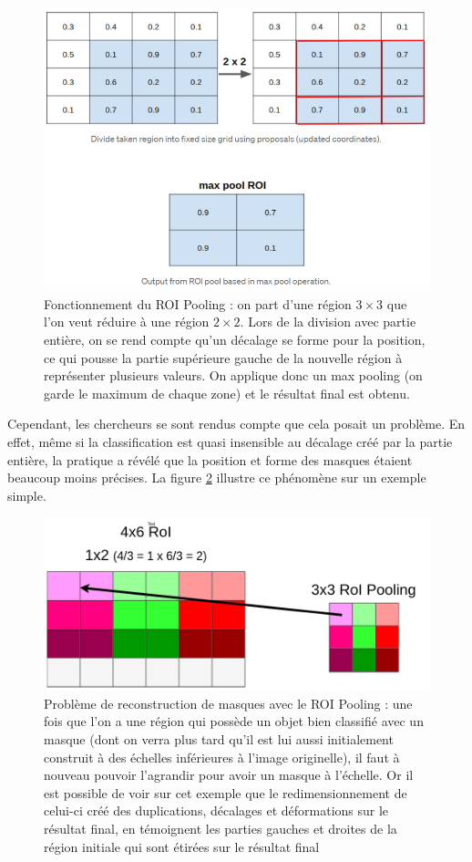 \begin{figure}[!h]
\centering
\includegraphics[width=200pts]{images/Mask_R_CNN/ROI_Pooling.png} 
\caption{Fonctionnement du ROI Pooling : on part d'une région $3 \times 3$ que l'on veut réduire à une région $2 \times 2$. Lors de la division avec partie entière, on se rend compte qu'un décalage se forme pour la position, ce qui pousse la partie supérieure gauche de la nouvelle région à représenter plusieurs valeurs. On applique donc un max pooling (on garde le maximum de chaque zone) et le résultat final est obtenu.}
\label{ROI_Pooling}
\end{figure}

Cependant, les chercheurs se sont rendus compte que cela posait un problème. En effet, même si la classification est quasi insensible au décalage créé par la partie entière, la pratique a révélé que la position et forme des masques étaient beaucoup moins précises. La figure \ref{ROI_pooling_problem} illustre ce phénomène sur un exemple simple.

\begin{figure}[!h]
\centering
\includegraphics[width=200pts]{images/Mask_R_CNN/ROI_pooling_problem.png} 
\caption{Problème de reconstruction de masques avec le ROI Pooling : une fois que l'on a une région qui possède un objet bien classifié avec un masque (dont on verra plus tard qu'il est lui aussi initialement construit à des échelles inférieures à l'image originelle), il faut à nouveau pouvoir l'agrandir pour avoir un masque à l'échelle. Or il est possible de voir sur cet exemple que le redimensionnement de celui-ci créé des duplications, décalages et déformations sur le résultat final, en témoignent les parties gauches et droites de la région initiale qui sont étirées sur le résultat final}
\label{ROI_pooling_problem}
\end{figure}

